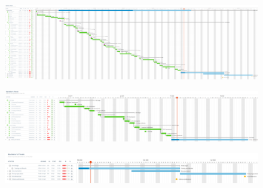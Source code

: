 \documentclass[titlepage,12pt]{report}
\begin{document}
\begin{appendices}
\begin{figure}[H]
	\centering
	\includegraphics[scale=0.30]{media/final_gantt_eng.png}
	\label{gantt_eng}
\end{figure}

\begin{figure}[H]
	\centering
  	\includegraphics[scale=0.25]{media/gantt_dev_eng_new.png}
  	\label{gantt_3}
\end{figure}

\begin{figure}[H]
	\centering
  	\includegraphics[scale=0.25]{media/gantt_final_eng.png}
  	\label{gantt_4}
\end{figure}

\useportrait

\end{appendices}

\listoffigures

\listoftables
\end{document}
